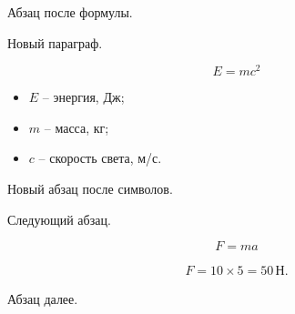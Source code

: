 Абзац после формулы.  %


Новый параграф.  

\begin{equation}
  E = mc^2
\end{equation}

\begin{symblock}
  \begin{itemize}[nosep, leftmargin=0pt, labelindent=0pt,
                   topsep=0pt, partopsep=0pt, 
                   itemsep=0pt, parsep=0pt]
    \item[] $E$ – энергия, Дж;
    \item[] $m$ – масса, кг;
    \item[] $c$ – скорость света, м/с.
  \end{itemize}
\end{symblock}

Новый абзац после символов.  %


Следующий абзац.  

\begin{equation}
  F = ma
\end{equation}

\begin{gather*}
  F = 10 \times 5 = 50\,\text{Н}.
\end{gather*}

Абзац далее.  %

